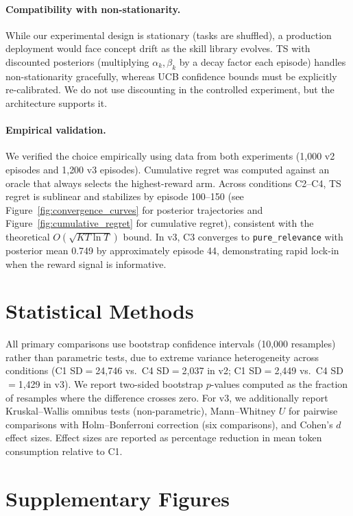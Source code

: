 \paragraph{Compatibility with non-stationarity.}
While our experimental design is stationary (tasks are shuffled), a production deployment would face concept drift as the skill library evolves.
TS with discounted posteriors (multiplying $\alpha_k, \beta_k$ by a decay factor each episode) handles non-stationarity gracefully, whereas UCB confidence bounds must be explicitly re-calibrated.
We do not use discounting in the controlled experiment, but the architecture supports it.

\paragraph{Empirical validation.}
We verified the choice empirically using data from both experiments (1{,}000 v2 episodes and 1{,}200 v3 episodes).
Cumulative regret was computed against an oracle that always selects the highest-reward arm.
Across conditions C2--C4, TS regret is sublinear and stabilizes by episode 100--150 (see Figure~\ref{fig:convergence_curves} for posterior trajectories and Figure~\ref{fig:cumulative_regret} for cumulative regret), consistent with the theoretical $O(\sqrt{KT \ln T})$ bound.
In v3, C3 converges to \texttt{pure\_relevance} with posterior mean 0.749 by approximately episode 44, demonstrating rapid lock-in when the reward signal is informative.

\section{Statistical Methods}
\label{app:stats}

All primary comparisons use bootstrap confidence intervals (10,000 resamples) rather than parametric tests, due to extreme variance heterogeneity across conditions (C1 SD$=$24{,}746 vs.\ C4 SD$=$2{,}037 in v2; C1 SD$=$2{,}449 vs.\ C4 SD$=$1{,}429 in v3).
We report two-sided bootstrap $p$-values computed as the fraction of resamples where the difference crosses zero.
For v3, we additionally report Kruskal--Wallis omnibus tests (non-parametric), Mann--Whitney $U$ for pairwise comparisons with Holm--Bonferroni correction (six comparisons), and Cohen's $d$ effect sizes.
Effect sizes are reported as percentage reduction in mean token consumption relative to C1.

\section{Supplementary Figures}
\label{app:figures}

